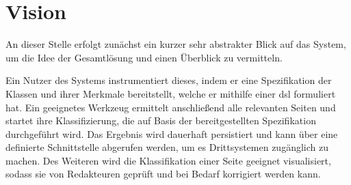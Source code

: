 \section{Vision}
    An dieser Stelle erfolgt zunächst ein kurzer sehr abstrakter Blick auf das System,
    um die Idee der Gesamtlösung und einen Überblick zu vermitteln.

    Ein Nutzer des Systems instrumentiert dieses,
    indem er eine Spezifikation der Klassen und ihrer Merkmale bereitstellt,
    welche er mithilfe einer \gls{dsl} formuliert hat.
    Ein geeignetes Werkzeug ermittelt anschließend alle relevanten Seiten und startet ihre Klassifizierung,
    die auf Basis der bereitgestellten Spezifikation durchgeführt wird.
    Das Ergebnis wird dauerhaft persistiert und kann über eine definierte Schnittstelle
    abgerufen werden, um es Drittsystemen zugänglich zu machen.
    Des Weiteren wird die Klassifikation einer Seite geeignet visualisiert,
    sodass sie von Redakteuren geprüft und bei Bedarf korrigiert werden kann.
